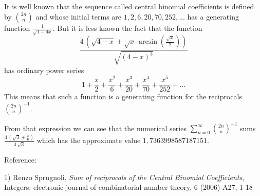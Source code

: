 \documentclass[12pt]{article}
\begin{document}
It is well known that the sequence called central binomial coefficients is defined by ${2n\choose n}$ and whose initial terms are $1,2,6,20,70, 252,...$ has a generating function $\frac{1}{\sqrt{1-4x}}$.
But it is less known the fact that
the function
$$\frac{4\,\left( {\sqrt{4 - x}} + {\sqrt{x}}\,\arcsin (\frac{{\sqrt{x}}}{2}) \right) }{{\sqrt{(4 - x)^3}}}
$$
has ordinary power series
$$1+\frac{x}{2}+\frac{x^2}{6}+\frac{x^3}{20}+\frac{x^4}{70}+\frac{x^5}{252}+...$$
This means that such a function is a generating function for the reciprocals ${2n\choose n}^{-1}$.

From that expression we can see that the numerical series $\sum_{n=0}^{\infty}{2n\choose n}^{-1}$ sums $\frac{4\,\left( {\sqrt{3}} + \frac{\pi }{6} \right) }{3\,{\sqrt{3}}}$ which has the approximate value $1,\!7363998587187151$.

\vskip1cm

Reference:

1) Renzo Sprugnoli, {\it Sum of reciprocals of the Central Binomial Coefficients}, Integers: electronic 
journal of combinatorial number theory, 6 (2006) A27, 1-18
\end{document}
